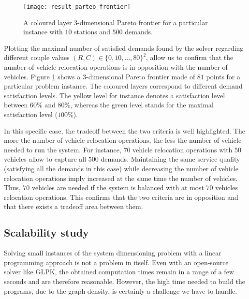 \begin{bibunit}[ieeetr]

\begin{figure}[t]
\centering
\texttt{[image: result\_parteo\_frontier]}
\caption{A coloured layer 3-dimensional Pareto frontier for a particular instance with $10$ stations and $500$ demands.}
\label{fig_pareto}
\end{figure}

\bigskip
Plotting the maximal number of satisfied demands found by the solver regarding different couple values ${(R, C) \in \{0, 10, \dots, 80\}^2}$, allow us to confirm that the number of vehicle relocation operations is in opposition with the number of vehicles.
Figure \ref{fig_pareto} shows a 3-dimensional Pareto frontier made of $81$ points for a particular problem instance.
The coloured layers correspond to different demand satisfaction levels.
The yellow level for instance denotes a satisfaction level between $60$\% and $80$\%, whereas the green level stands for the maximal satisfaction level ($100$\%).

\bigskip
In this specific case, the tradeoff between the two criteria is well highlighted.
The more the number of vehicle relocation operations, the less the number of vehicle needed to run the system.
For instance, $70$ vehicle relocation operations with $50$ vehicles allow to capture all $500$ demands.
Maintaining the same service quality (satisfying all the demands in this case) while decreasing the number of vehicle relocation operations imply increased at the same time the number of vehicles.
Thus, $70$ vehicles are needed if the system is balanced with at most $70$ vehicles relocation operations.
This confirms that the two criteria are in opposition and that there exists a tradeoff area between them.

\subsection{Scalability study}
Solving small instances of the system dimensioning problem with a linear programming approach is not a problem in itself.
Even with an open-source solver like GLPK, the obtained computation times remain in a range of a few seconds and are therefore reasonable.
However, the high time needed to build the programs, due to the graph density, is certainly a challenge we have to handle.


\end{bibunit}
